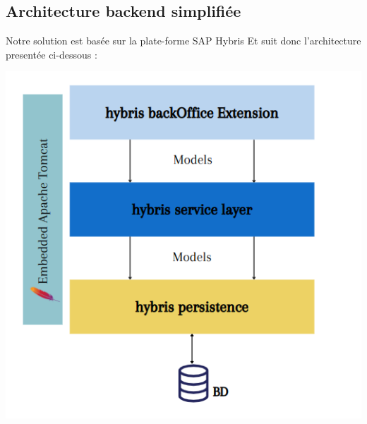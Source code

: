 \subsection{Architecture backend simplifiée}
Notre solution est basée sur la plate-forme SAP Hybris Et suit donc l'architecture presentée ci-dessous :
\begin{center}
    \centering
    \includegraphics[width=14cm]{Figures/architecturebacend.png}
    \label{fig:processus}
\end{center}

